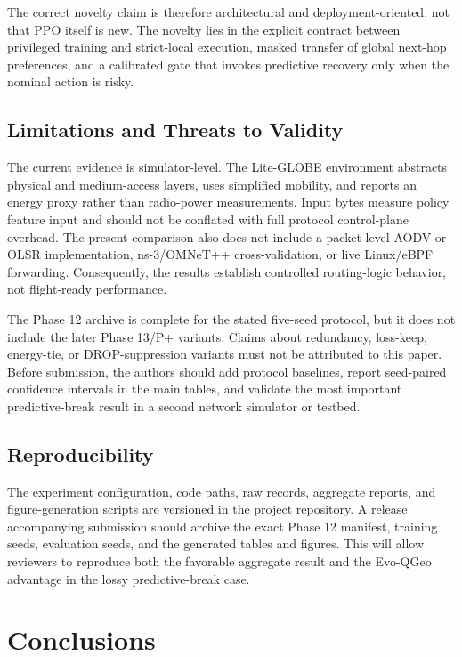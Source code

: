 \documentclass[drones,article,submit,moreauthors]{Definitions/mdpi}
\begin{document}
The correct novelty claim is therefore architectural and deployment-oriented, not that PPO itself is new. The novelty lies in the explicit contract between privileged training and strict-local execution, masked transfer of global next-hop preferences, and a calibrated gate that invokes predictive recovery only when the nominal action is risky.

\subsection{Limitations and Threats to Validity}

The current evidence is simulator-level. The Lite-GLOBE environment abstracts physical and medium-access layers, uses simplified mobility, and reports an energy proxy rather than radio-power measurements. Input bytes measure policy feature input and should not be conflated with full protocol control-plane overhead. The present comparison also does not include a packet-level AODV or OLSR implementation, ns-3/OMNeT++ cross-validation, or live Linux/eBPF forwarding. Consequently, the results establish controlled routing-logic behavior, not flight-ready performance.

The Phase 12 archive is complete for the stated five-seed protocol, but it does not include the later Phase 13/P+ variants. Claims about redundancy, loss-keep, energy-tie, or DROP-suppression variants must not be attributed to this paper. Before submission, the authors should add protocol baselines, report seed-paired confidence intervals in the main tables, and validate the most important predictive-break result in a second network simulator or testbed.

\subsection{Reproducibility}

The experiment configuration, code paths, raw records, aggregate reports, and figure-generation scripts are versioned in the project repository. A release accompanying submission should archive the exact Phase 12 manifest, training seeds, evaluation seeds, and the generated tables and figures. This will allow reviewers to reproduce both the favorable aggregate result and the Evo-QGeo advantage in the lossy predictive-break case.

\section{Conclusions}
\end{document}
